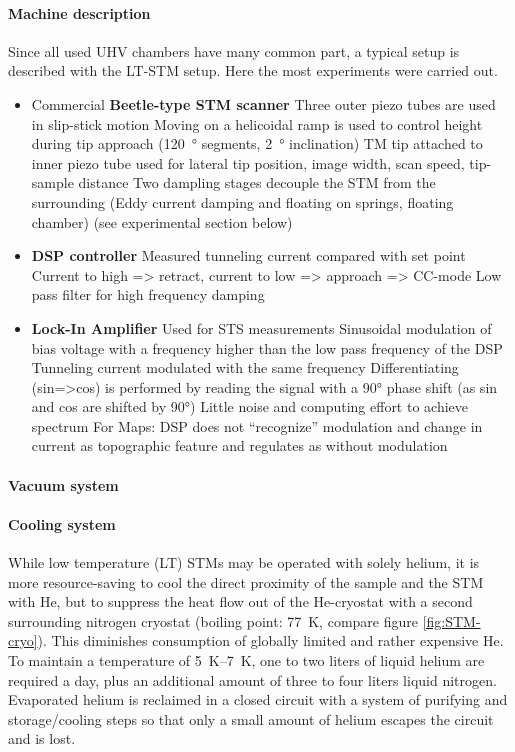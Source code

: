 \paragraph{Machine description}
Since all used UHV chambers have many common part, a typical setup is described with the LT-STM setup. Here the most experiments were carried out.
\begin{itemize}
	\item Commercial \textbf{Beetle-type STM scanner} \cite{zoephel_aufbau_2000}
	\subitem Three outer piezo tubes are used in slip-stick motion
	\subitem Moving on a helicoidal ramp is used to control height during tip approach (\SI{120}{\degree} segments, \SI{2}{\degree} inclination)
	\subitem TM tip attached to inner piezo tube used for lateral tip position, image width, scan speed, tip-sample distance
	\subitem Two dampling stages decouple the STM
	from the surrounding (Eddy current damping and floating on springs, floating chamber) (see experimental section below)
	\item \textbf{DSP controller}
	\subitem Measured tunneling current compared with set point
	\subitem Current to high => retract, current to low => approach => CC-mode
	\subitem Low pass filter for high frequency damping
	\item \textbf{Lock-In Amplifier}
	\subitem Used for STS measurements
	\subitem Sinusoidal modulation of bias voltage with a frequency higher than the low pass frequency of the DSP 
	\subitem Tunneling current modulated with the same frequency
	\subitem Differentiating (sin=>cos) is performed by reading the signal with a 90° phase shift (as sin and cos are shifted by 90°)
	\subitem Little noise and computing effort to achieve spectrum
	\subitem For Maps: DSP does not “recognize” modulation and change in current as topographic feature and regulates as without modulation
\end{itemize}

\paragraph{Vacuum system}

\paragraph{Cooling system} 
While low temperature (LT) STMs may be operated with solely helium, it is more resource-saving to cool the direct proximity of the sample and the STM with He, but to suppress the heat flow out of the He-cryostat with a second surrounding nitrogen cryostat (boiling point: \SI{77}{\K}, compare figure \ref{fig:STM-cryo}). This diminishes consumption of globally limited and rather expensive He. To maintain a temperature of \SIrange{5}{7}{\K}, one to two liters of liquid helium are required a day, plus an additional amount of three to four liters liquid nitrogen. Evaporated helium is reclaimed in a closed circuit with a system of purifying and storage/cooling steps so that only a small amount of helium escapes the circuit and is lost.

